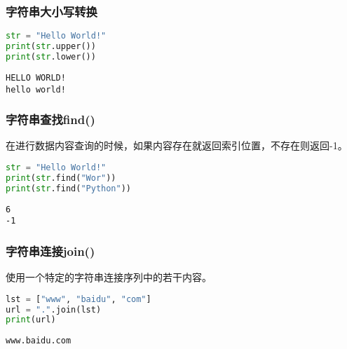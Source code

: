 \subsubsection{字符串大小写转换}

\vspace{0.5cm}


\begin{lstlisting}[language=Python]
str = "Hello World!"
print(str.upper())
print(str.lower())
\end{lstlisting}

\begin{tcolorbox}
	\begin{verbatim}
HELLO WORLD!
hello world!
\end{verbatim}
\end{tcolorbox}

\subsubsection{字符串查找find()}

在进行数据内容查询的时候，如果内容存在就返回索引位置，不存在则返回-1。\\


\begin{lstlisting}[language=Python]
str = "Hello World!"
print(str.find("Wor"))
print(str.find("Python"))
\end{lstlisting}

\begin{tcolorbox}
	\begin{verbatim}
6
-1
\end{verbatim}
\end{tcolorbox}

\subsubsection{字符串连接join()}

使用一个特定的字符串连接序列中的若干内容。\\


\begin{lstlisting}[language=Python]
lst = ["www", "baidu", "com"]
url = ".".join(lst)
print(url)
\end{lstlisting}

\begin{tcolorbox}
	\begin{verbatim}
www.baidu.com
\end{verbatim}
\end{tcolorbox}

